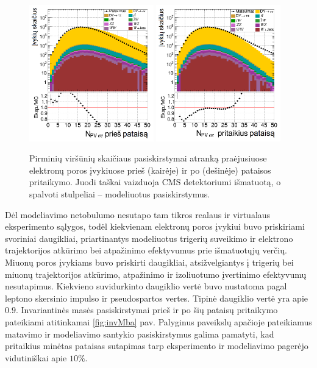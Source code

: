 \documentclass[a4paper, 12pt, oneside]{article}
\begin{document}
\begin{figure}[H]
	\includegraphics[width=0.48\textwidth]{nVTXee_before.png}
	\includegraphics[width=0.48\textwidth]{nVTXee_after.png}
	\caption{\label{fig:PUba} Pirminių viršūnių skaičiaus pasiskirstymai atranką praėjusiuose elektronų poros
		įvykiuose prieš (kairėje) ir po (dešinėje) pataisos pritaikymo.
		Juodi taškai vaizduoja CMS detektoriumi išmatuotą, o spalvoti stulpeliai -- modeliuotus pasiskirstymus.}
\end{figure}

Dėl modeliavimo netobulumo nesutapo tam tikros realaus ir virtualaus eksperimento sąlygos, todėl
kiekvienam elektronų poros įvykiui buvo priskiriami svoriniai daugikliai, priartinantys modeliuotus trigerių
suveikimo ir elektrono trajektorijos atkūrimo bei atpažinimo efektyvumus prie išmatuotųjų verčių.
Miuonų poros įvykiams buvo priskirti daugikliai, atsižvelgiantys į trigerių bei miuonų trajektorijos atkūrimo,
atpažinimo ir izoliuotumo įvertinimo efektyvumų nesutapimus.
Kiekvieno suvidurkinto daugiklio vertė buvo nustatoma pagal leptono skersinio impulso ir pseudospartos vertes.
Tipinė daugiklio vertė yra apie $0.9$.
Invariantinės masės pasiskirstymai prieš ir po šių pataisų pritaikymo pateikiami atitinkamai \ref{fig:invMba} pav.
Palyginus paveikslų apačioje pateikiamus matavimo ir modeliavimo santykio pasiskirstymus galima pamatyti, kad
pritaikius minėtas pataisas sutapimas tarp eksperimento ir modeliavimo pagerėjo vidutiniškai apie $10\%$.
\end{document}
